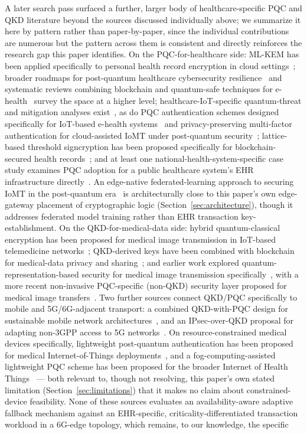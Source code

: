 \documentclass[journal]{IEEEtran}
\newcommand{\keyest}{key-establishment}
\begin{document}
A later search pass surfaced a further, larger body of healthcare-specific PQC and QKD literature beyond the sources discussed individually above; we summarize it here by pattern rather than paper-by-paper, since the individual contributions are numerous but the pattern across them is consistent and directly reinforces the research gap this paper identifies. On the PQC-for-healthcare side: ML-KEM has been applied specifically to personal health record encryption in cloud settings~\cite{kyberphr2025}; broader roadmaps for post-quantum healthcare cybersecurity resilience~\cite{pqhealthcareroadmap2024} and systematic reviews combining blockchain and quantum-safe techniques for e-health~\cite{blockchainquantumehealth2025} survey the space at a higher level; healthcare-IoT-specific quantum-threat and mitigation analyses exist~\cite{alif2024healthcareiot}, as do PQC authentication schemes designed specifically for IoT-based e-health systems~\cite{pqcaie2024} and privacy-preserving multi-factor authentication for cloud-assisted IoMT under post-quantum security~\cite{mfaiomt2024}; lattice-based threshold signcryption has been proposed specifically for blockchain-secured health records~\cite{blockchainlatticeehr2025}; and at least one national-health-system-specific case study examines PQC adoption for a public healthcare system's EHR infrastructure directly~\cite{southafricaehr2025}. An edge-native federated-learning approach to securing IoMT in the post-quantum era~\cite{edgenativefederatediomt2026} is architecturally close to this paper's own edge-gateway placement of cryptographic logic (Section~\ref{sec:architecture}), though it addresses federated model training rather than EHR transaction \keyest. On the QKD-for-medical-data side: hybrid quantum-classical encryption has been proposed for medical image transmission in IoT-based telemedicine networks~\cite{hybridmedicalimage2024}; QKD-derived keys have been combined with blockchain for medical-data privacy and sharing~\cite{quantumkeymedicalblockchain2025}; and earlier work explored quantum-representation-based security for medical image transmission specifically~\cite{secmedicalimage2021}, with a more recent non-invasive PQC-specific (non-QKD) security layer proposed for medical image transfers~\cite{noninvasivepqcmedimage2026}. Two further sources connect QKD/PQC specifically to mobile and 5G/6G-adjacent transport: a combined QKD-with-PQC design for sustainable mobile network architectures~\cite{sustainablemobileqkdpqc2024}, and an IPsec-over-QKD proposal for adapting non-3GPP access to 5G networks~\cite{ipsecqkd5g2026}. On resource-constrained medical devices specifically, lightweight post-quantum authentication has been proposed for medical Internet-of-Things deployments~\cite{lightweightmedicaliot2023}, and a fog-computing-assisted lightweight PQC scheme has been proposed for the broader Internet of Health Things~\cite{iohtfog2025} --- both relevant to, though not resolving, this paper's own stated limitation (Section~\ref{sec:limitations}) that it makes no claim about constrained-device feasibility. None of these sources evaluates an availability-aware adaptive fallback mechanism against an EHR-specific, criticality-differentiated transaction workload in a 6G-edge topology, which remains, to our knowledge, the specific 
\end{document}
